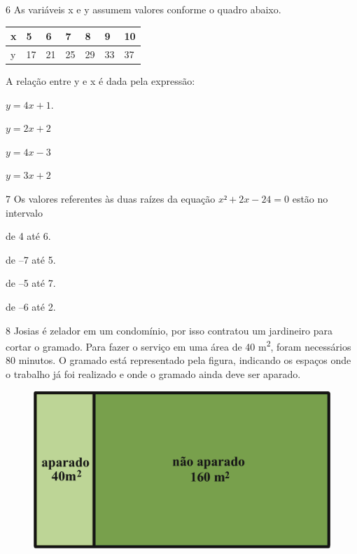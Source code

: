 \pagebreak
\num{6} As variáveis x e y assumem valores conforme o quadro abaixo.

\begin{longtable}[]{@{}lllllll@{}}
\toprule
x & 5 & 6 & 7 & 8 & 9 & 10\tabularnewline
\midrule
\endhead
y & 17 & 21 & 25 & 29 & 33 & 37\tabularnewline
\bottomrule
\end{longtable}

A relação entre y e x é dada pela expressão:

\begin{escolha}
  
  \item $y = 4x + 1$. 
  
  \item $y = 2x + 2$ 
  
  \item $y = 4x - 3$ 
  
  \item $y = 3x + 2$

\end{escolha}

\num{7} Os valores referentes às duas raízes da equação $x² + 2x - 24
= 0$ estão no intervalo

\begin{escolha}

  \item de 4 até 6. 

  \item de --7 até 5. 

  \item de --5 até 7. 

  \item de --6 até 2.

\end{escolha}

\num{8} Josias é zelador em um condomínio, por isso contratou um jardineiro
para cortar o gramado. Para fazer o serviço em uma área de 
40 m\textsuperscript{2}, foram necessários 80 minutos. O gramado está
representado pela figura, indicando os espaços onde o trabalho já foi
realizado e onde o gramado ainda deve ser aparado.

\begin{figure}[htpb!]
\centering
\includegraphics[width=.9\textwidth]{./ilustras-mat/Simulado_3-atividade_8.png}
\end{figure}


